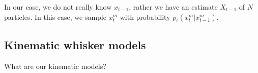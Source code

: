 In our case, we do not really know $x_{t-1}$, rather we have an estimate $X_{t-1}$ of $N$ particles. In this case, we sample $x_t^m$ with probability $p_t\left(x_t^m | x_{t-1}^m\right)$.

\subsection{Kinematic whisker models}
What are our kinematic models?
